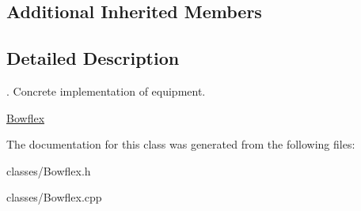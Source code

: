 \subsection*{Additional Inherited Members}


\subsection{Detailed Description}
. Concrete implementation of equipment.

\hyperlink{class_bowflex}{Bowflex} 

The documentation for this class was generated from the following files\+:\begin{DoxyCompactItemize}
\item 
classes/Bowflex.\+h\item 
classes/Bowflex.\+cpp\end{DoxyCompactItemize}
